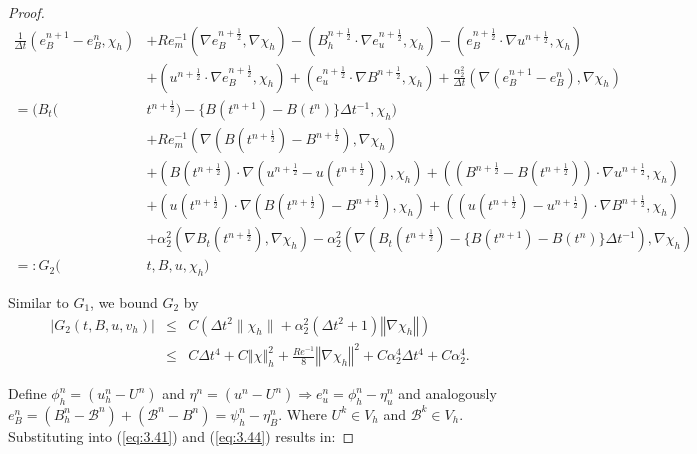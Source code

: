 \documentclass[11pt]{article}%
\numberwithin{equation}{section}
\newcommand{\norm}[1]{\left\Vert#1\right\Vert}
\def\grad{{\nabla}}
\def\nplushalf{{n+\frac12}}
\begin{document}
\begin{proof}
\begin{equation}
	\begin{split}
	\frac{1}{\Delta t}(e^{n+1}_{B} - e^{n}_{B},\chi_{h}) & + Re^{-1}_{m}(\grad{e}^{\nplushalf}_{B},\grad{\chi}_{h}) - (B^{\nplushalf}_{h}\cdot \grad{e}^{\nplushalf}_{u},\chi_{h}) - (e^{\nplushalf}_{B}\cdot \grad{u}^{\nplushalf},\chi_{h})\\
& + (u^{\nplushalf}\cdot \grad{e}^{\nplushalf}_{B},\chi_{h}) + (e^{\nplushalf}_{u}\cdot \grad{B}^{\nplushalf},\chi_{h})+\frac{\alpha_2^2}{\Delta t}(\nabla (e^{n+1}_{B} - e^{n}_{B}),\nabla \chi_{h})  \\
	= (B_{t}(&t^{\nplushalf}) - \{B(t^{n+1}) - B(t^{n})\}\Delta t^{-1},\chi_{h}) \\
	& + Re^{-1}_{m}(\grad{(B(t^{\nplushalf}) - B^{\nplushalf})},\grad{\chi}_{h}) \\
	& + (B(t^{\nplushalf})\cdot\grad{(u^{\nplushalf} - u(t^{\nplushalf}))},\chi_{h}) + ((B^{\nplushalf} - B(t^{\nplushalf}))\cdot \grad{u}^{\nplushalf},\chi_{h}) \\
	& + (u(t^{\nplushalf})\cdot\grad{(B(t^{\nplushalf}) - B^{\nplushalf})},\chi_{h}) + ((u(t^{\nplushalf}) - u^{\nplushalf})\cdot\grad{B}^{\nplushalf},\chi_{h})\\
& + \alpha_2^2 (\nabla B_t(t^{n+\frac12}),\nabla \chi_h)- \alpha_2^2(\nabla(B_{t}(t^{\nplushalf}) - \{B(t^{n+1}) - B(t^{n})\}\Delta t^{-1}),\nabla \chi_{h}) \\
	=: G_{2}(&t,B,u,\chi_{h})
	\end{split}
	\label{eq:3.44}
	\end{equation}
	
	Similar to $G_1$, we bound $G_2$ by
	\begin{eqnarray}
	| G_2(t,B,u,v_h) |  & \le & C(\Delta t^2 \| \chi_h \|+\alpha_2^2(\Delta t^2+1)\norm{\grad{\chi}_h}) \nonumber \\
	& \le & C\Delta t^4 + C\norm{\chi}_h^2+\frac{Re^{-1}}{8}\norm{\grad{\chi}_h}^2+C\alpha_2^4\Delta t^4 +C\alpha_2^4. \label{g2bound}
	\end{eqnarray}


	Define $\phi^{n}_{h} = (u^{n}_{h} - U^{n})$ and $\eta^{n} = (u^{n} - U^{n}) \Rightarrow e^{n}_{u} = \phi^{n}_{h} - \eta^{n}_{u}$ and analogously $e^{n}_{B} = (B^{n}_{h} - \mathcal{B}^{n}) + (\mathcal{B}^{n} - B^{n}) = \psi^{n}_{h} - \eta^{n}_{B}$.  Where $U^{k} \in V_{h}$ and $\mathcal{B}^{k}\in V_{h}$.  Substituting into (\ref{eq:3.41}) and (\ref{eq:3.44}) results in:
	

\end{proof}
\end{document}
